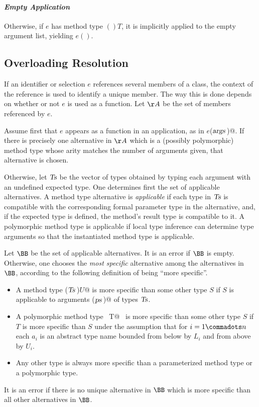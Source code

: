 \paragraph{\em Empty Application}
  Otherwise, if $e$ has method type $()T$, it is implicitly applied to the empty
  argument list, yielding $e()$.

\subsection{Overloading Resolution}
\label{sec:overloading-resolution}

If an identifier or selection $e$ references several members of a
class, the context of the reference is used to identify a unique
member.  The way this is done depends on whether or not $e$ is used as
a function.  Let $\AA$ be the set of members referenced by $e$.

Assume first that $e$ appears as a function in an application, as
in \lstinline@$e$($\mbox{\sl args}\,$)@.  If there is precisely one alternative in
$\AA$ which is a (possibly polymorphic) method type whose arity
matches the number of arguments given, that alternative is chosen.

Otherwise, let $\mbox{\sl Ts}$ be the vector of types obtained by
typing each argument with an undefined expected type. One determines
first the set of applicable alternatives. A method type alternative is
{\em applicable} if each type in $\mbox{\sl Ts}$ is compatible with
the corresponding formal parameter type in the alternative, and, if 
the expected type is defined, the method's result type is compatible to
it.  A polymorphic method type is applicable if local type inference
can determine type arguments so that the instantiated method type is
applicable.

Let $\BB$ be the set of applicable alternatives. It is an error if
$\BB$ is empty. Otherwise, one chooses the {\em most specific}
alternative among the alternatives in $\BB$, according to the
following definition of being ``more specific''.
\begin{itemize} 
\item
A method type \lstinline@($\mbox{\sl Ts}\,$)$U$@ is more specific than some other
type $S$ if $S$ is applicable to arguments \lstinline@($\mbox{\sl ps}\,$)@ of
types $\mbox{\sl Ts}$.
\item
A polymorphic method type
~\lstinline@[$a_1$ >: $L_1$ <: $U_1 \commadots a_n$ >: $L_n$ <: $U_n$]T@~ is
more specific than some other type $S$ if $T$ is more
specific than $S$ under the assumption that for
$i = 1 \commadots n$ each $a_i$ is an abstract type name
bounded from below by $L_i$ and from above by $U_i$.
\item
Any other type is always more specific than a parameterized method
type or a polymorphic type.
\end{itemize}
It is an error if there is no unique alternative in $\BB$ which is
more specific than all other alternatives in $\BB$.

